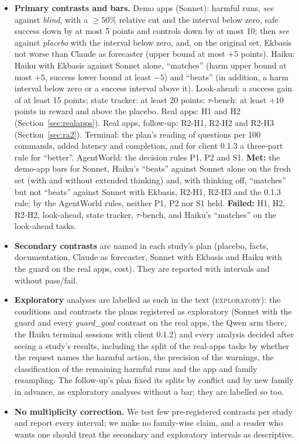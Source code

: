 \documentclass[11pt]{article}
\newcommand{\explo}{\textsc{exploratory}}
\begin{document}
\begin{itemize}
  \item \textbf{Primary contrasts and bars.} Demo apps (Sonnet): harmful runs, \emph{see} against \emph{blind}, with a
  $\ge 50\%$ relative cut and the interval below zero, safe success down by at most 5 points and controls down by at most
  10; then \emph{see} against \emph{placebo} with the interval below zero, and, on the original set, Ekbasis not worse
  than Claude as forecaster (upper bound at most $+5$ points). Haiku: Haiku with Ekbasis against Sonnet alone,
  ``matches'' (harm upper bound at most $+5$, success lower bound at least $-5$) and ``beats'' (in addition, a harm interval
  below zero or a success interval above it). Look-ahead: a success gain of at least 15 points; state tracker: at least
  20 points; $\tau$-bench: at least $+10$ points in reward and above the placebo. Real apps: H1 and H2
  (Section~\ref{sec:realapps}). Real apps, follow-up: R2-H1, R2-H2 and R2-H3 (Section~\ref{sec:ra2}). Terminal: the plan's
  reading of questions per 100 commands, added latency and completion, and for client 0.1.3 a three-part rule for
  ``better''. AgentWorld: the decision rules P1, P2 and S1. \textbf{Met:} the demo-app bars for Sonnet, Haiku's
  ``beats'' against Sonnet alone on the fresh set (with and without extended thinking) and, with thinking off,
  ``matches'' but not ``beats'' against Sonnet with Ekbasis, R2-H1, R2-H3 and the 0.1.3 rule; by the AgentWorld
  rules, neither P1, P2 nor S1 held. \textbf{Failed:} H1, H2, R2-H2, look-ahead, state tracker, $\tau$-bench, and Haiku's
  ``matches'' on the look-ahead tasks.
  \item \textbf{Secondary contrasts} are named in each study's plan (placebo, facts, documentation, Claude as forecaster,
  Sonnet with Ekbasis and Haiku with the guard on the real apps, cost). They are reported with intervals and without
  pass/fail.
  \item \textbf{Exploratory} analyses are labelled as such in the text (\explo): the conditions and contrasts the plans
  registered as exploratory (Sonnet with the guard and every \emph{guard\_goal} contrast on the real apps, the Qwen arm
  there, the Haiku terminal sessions with client 0.1.2) and every analysis decided after seeing a study's results,
  including the split of the real-apps tasks by whether the request names the harmful action, the precision of the
  warnings, the classification of the remaining harmful runs and the app and family resampling. The follow-up's plan fixed
  its splits by conflict and by new family in advance, as exploratory analyses without a bar; they are labelled so too.
  \item \textbf{No multiplicity correction.} We test few pre-registered contrasts per study and report every interval; we
  make no family-wise claim, and a reader who wants one should treat the secondary and exploratory intervals as
  descriptive.
\end{itemize}
\end{document}
